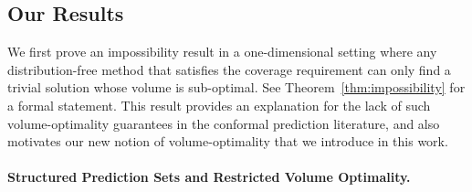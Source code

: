 
\subsection{Our Results}

 We first prove an impossibility result in a one-dimensional setting where any distribution-free method that satisfies the coverage requirement can only find a trivial solution whose volume is sub-optimal. See Theorem~\ref{thm:impossibility} for a formal statement. This result provides an explanation for the lack of such volume-optimality guarantees in the conformal prediction literature, and also motivates our new notion of volume-optimality that we introduce in this work. 


\paragraph{Structured Prediction Sets and Restricted Volume Optimality.}



